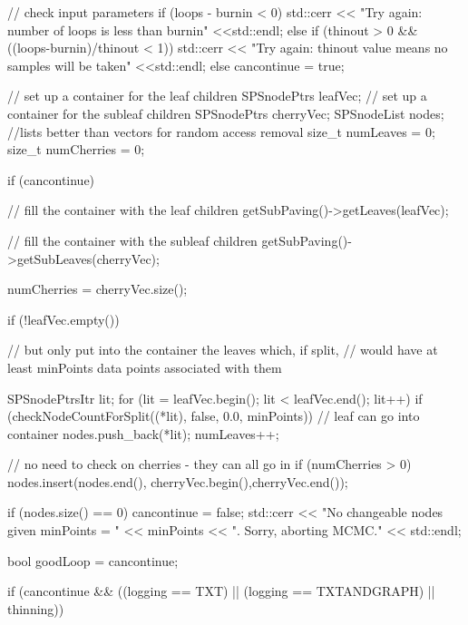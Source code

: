 \begin{DoxyCode}
{{{        // check input parameters
        if (loops - burnin < 0) {
            std::cerr << "Try again: number of loops is less than burnin"
                    <<std::endl;
        }
        else if (thinout > 0 && ((loops-burnin)/thinout < 1)) {
            std::cerr << "Try again: thinout value means no samples will be
       taken"
                    <<std::endl;
        }
        else cancontinue = true;

        // set up a container for the leaf children
        SPSnodePtrs leafVec;
        // set up a container for the subleaf children
        SPSnodePtrs cherryVec;
        SPSnodeList nodes;
         //lists better than vectors for random access removal
        size_t numLeaves = 0;
        size_t numCherries = 0;

        if (cancontinue) {

            // fill the container with the leaf children
            getSubPaving()->getLeaves(leafVec);

            // fill the container with the subleaf children
            getSubPaving()->getSubLeaves(cherryVec);

            numCherries = cherryVec.size();

            if (!leafVec.empty()) {
                // but only put into the container the leaves which, if split,
                // would have at least minPoints data points associated with
       them

                SPSnodePtrsItr lit;
                for (lit = leafVec.begin(); lit < leafVec.end(); lit++) {
                    if (checkNodeCountForSplit((*lit), false, 0.0, minPoints))
                    {
                        // leaf can go into container
                        nodes.push_back(*lit);
                        numLeaves++;
                    }
                }
            }

            // no need to check on cherries - they can all go in
            if (numCherries > 0)
                nodes.insert(nodes.end(), cherryVec.begin(),cherryVec.end());

            if (nodes.size() == 0) {
                cancontinue = false;
                std::cerr << "No changeable nodes given minPoints = "
                            << minPoints << ". Sorry, aborting MCMC." << 
      std::endl;
            }
        }

        bool goodLoop = cancontinue;

        if (cancontinue && ((logging == TXT) || (logging == TXTANDGRAPH)
                                            || thinning)) {

}}}}
\end{DoxyCode}
